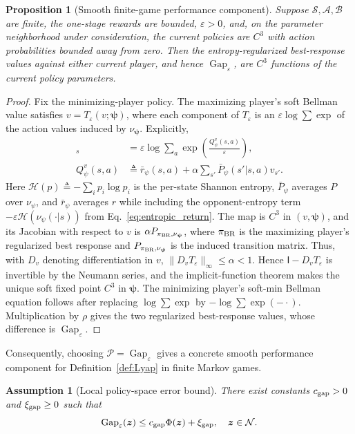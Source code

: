 \documentclass{article}
\newtheorem{proposition}{Proposition}
\newtheorem{assumption}{Assumption}
\theoremstyle{remark}
\newcommand{\Id}{\mathsf{I}}
\newcommand{\cN}{\mathcal{N}}
\newcommand{\bz}{\boldsymbol{z}}
\newcommand{\bpsi}{\boldsymbol{\psi}}
\newcommand{\cP}{\mathcal{P}}
\begin{document}
\begin{proposition}[Smooth finite-game performance component]\label{prop:smooth_entropy_gap}
Suppose $\mathcal S,\mathcal A,\mathcal B$ are finite, the one-stage rewards are bounded, $\varepsilon>0$, and, on the parameter neighborhood under consideration, the current policies are $C^3$ with action probabilities bounded away from zero.
Then the entropy-regularized best-response values against either current player, and hence $\operatorname{Gap}_\varepsilon$, are $C^3$ functions of the current policy parameters.
\end{proposition}
\begin{proof}
Fix the minimizing-player policy.
The maximizing player's soft Bellman value satisfies $v=T_\varepsilon(v;\bpsi)$, where each component of $T_\varepsilon$ is an $\varepsilon\log\sum\exp$ of the action values induced by $\nu_{\bpsi}$.
Explicitly,
\begin{align*}
[T_\varepsilon(v;\bpsi)]_s
&=\varepsilon\log\sum_a \exp\!\left(\frac{Q_\psi^v(s,a)}
{\varepsilon}\right),\\
Q_\psi^v(s,a)
&\triangleq \bar r_\psi(s,a)
+\alpha\sum_{s'}\bar P_\psi(s'|s,a)v_{s'} .
\end{align*}
Here $\mathcal H(p)\triangleq-\sum_i p_i\log p_i$ is the per-state Shannon entropy, $\bar P_\psi$ averages $P$ over $\nu_\psi$, and $\bar r_\psi$ averages $r$ while including the opponent-entropy term $-\varepsilon\mathcal H(\nu_\psi(\cdot|s))$ from Eq.~\eqref{eq:entropic_return}.
The map is $C^3$ in $(v,\bpsi)$, and its Jacobian with respect to $v$ is $\alpha P_{\pi_{\rm BR},\nu_{\bpsi}}$, where $\pi_{\rm BR}$ is the maximizing player's regularized best response and $P_{\pi_{\rm BR},\nu_{\bpsi}}$ is the induced transition matrix.
Thus, with $D_v$ denoting differentiation in $v$, $\|D_vT_\varepsilon\|_\infty\le\alpha<1$.
Hence $\Id-D_vT_\varepsilon$ is invertible by the Neumann series, and the implicit-function theorem makes the unique soft fixed point $C^3$ in $\bpsi$.
The minimizing player's soft-min Bellman equation follows after replacing $\log\sum\exp$ by $-\log\sum\exp(-\cdot)$.
Multiplication by $\rho$ gives the two regularized best-response values, whose difference is $\operatorname{Gap}_\varepsilon$.
\end{proof}

Consequently, choosing $\cP=\operatorname{Gap}_\varepsilon$ gives a concrete smooth performance component for Definition~\ref{def:Lyap} in finite Markov games.

\begin{assumption}[Local policy-space error bound]\label{ass:performance_error_bound}
There exist constants $c_{\rm gap}>0$ and $\xi_{\rm gap}\ge0$ such that
\begin{equation}\label{eq:gap_error_bound}
\operatorname{Gap}_\varepsilon(\bz)
\le
c_{\rm gap}\Phi(\bz)+\xi_{\rm gap},
\quad
\bz\in\cN.
\end{equation}
\end{assumption}
\end{document}
